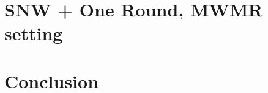 \documentclass[conference]{IEEEtran}
\begin{document}
\section{SNW + One Round,  MWMR setting}\label{mwmr_snow_one_round}



%
%
\vspace{-0.8em}
\section{Conclusion}


%



%

%

%

%

%

%

%

%
\end{document}

